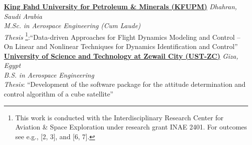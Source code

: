\href{https://kfupm.edu.sa/}{\textbf{King Fahd University for Petroleum \& Minerals (KFUPM)}}
\hfill {\textit{Dhahran, Saudi Arabia}}\\
\textit{M.Sc. in Aerospace Engineering (Cum Laude)}\\
\textit{Thesis}
\footnote{This work is conducted with the Interdisciplinary Research Center for Aviation \& Space Exploration under research grant INAE 2401. For outcomes see e.g., [2, 3], and [6, 7].}:``Data-driven Approaches for Flight Dynamics Modeling and Control -- On Linear and Nonlinear
Techniques for Dynamics Identification and Control''\\


\vspace{0.1 cm}
\href{https://zewailcity.edu.eg/}{\textbf{University of Science and Technology at Zewail City (UST-ZC)}}
\hfill {\textit{Giza, Egypt}}\\
\textit{B.S. in Aerospace Engineering}\\
\textit{Thesis}: {``Development of the software package for the attitude determination and control
algorithm of a cube satellite''} \\
